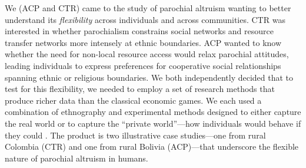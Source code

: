 \documentclass[bibauthoryear]{aa}
\begin{document}
We (ACP and CTR) came to the study of parochial altruism wanting to better understand its \textit{flexibility} across individuals and across communities. CTR was interested in whether parochialism constrains social networks and resource transfer networks more intensely at ethnic boundaries. ACP wanted to know whether the need for non-local resource access would relax parochial attitudes, leading individuals to express preferences for cooperative social relationships spanning ethnic or religious boundaries. We both independently decided that to test for this flexibility, we needed  to employ a set of research methods that produce richer data than the classical economic games. We each used a combination of ethnography and experimental %
 methods designed to either capture the real world  or to capture the ``private world''---how individuals would behave if they could \citep{Pisor2020}. %
The product is two illustrative case studies---one from rural Colombia (CTR) and one from rural Bolivia (ACP)---that underscore the flexible nature of parochial altruism in humans.
\end{document}
